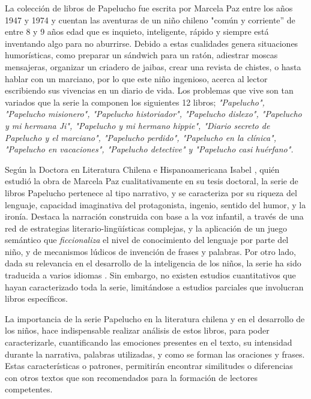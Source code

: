 La colección de libros de Papelucho fue escrita por Marcela Paz entre los años 1947 y 1974 y cuentan las aventuras de un niño chileno "común y corriente” de entre 8 y 9 años edad que es inquieto, inteligente, rápido y siempre está inventando algo para no aburrirse. Debido a estas cualidades genera situaciones humorísticas, como preparar un sándwich para un ratón, adiestrar moscas mensajeras, organizar un criadero de jaibas, crear una revista de chistes, o hasta hablar con un marciano, por lo que este niño ingenioso, acerca al lector escribiendo sus vivencias en un diario de vida. Los problemas que vive son tan variados que la serie la componen los siguientes 12 libros; \textit{"Papelucho", "Papelucho misionero", "Papelucho historiador", "Papelucho dislexo", "Papelucho y mi hermana Ji", "Papelucho y mi hermano hippie", "Diario secreto de Papelucho y el marciano", "Papelucho perdido", "Papelucho en la clínica", "Papelucho en vacaciones", "Papelucho detective" y "Papelucho casi huérfano".} 

Según la Doctora en Literatura Chilena e Hispanoamericana Isabel \citet{Ibaceta2018}, quién estudió la obra de Marcela Paz cualitativamente en su tesis doctoral, la serie de libros Papelucho pertenece al tipo narrativo, y se caracteriza por su riqueza del lenguaje, capacidad imaginativa del protagonista, ingenio, sentido del humor, y la ironía. Destaca la narración construida con base a la voz infantil, a través de una red de estrategias literario-lingüísticas complejas, y la aplicación de un juego semántico que \textit{ficcionaliza} el nivel de conocimiento del lenguaje por parte del niño, y de mecanismos lúdicos de invención de frases y palabras. Por otro lado, dada su relevancia en el desarrollo de la inteligencia de los niños, la serie ha sido traducida a varios idiomas \citep{HINIOJOSA2011}. Sin embargo, no existen estudios cuantitativos que hayan caracterizado toda la serie, limitándose a estudios parciales que involucran libros específicos.

La importancia de la serie Papelucho en la literatura chilena y en el desarrollo de los niños, hace indispensable realizar análisis de estos libros, para poder caracterizarle, cuantificando las emociones presentes en el texto, su intensidad durante la narrativa, palabras utilizadas, y como se forman las oraciones y frases. Estas características o patrones, permitirán encontrar similitudes o diferencias con otros textos que son recomendados para la formación de lectores competentes.

